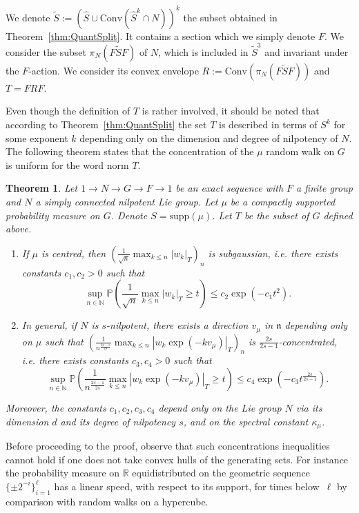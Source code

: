 \documentclass[11pt,leqno]{article}
\theoremstyle{plain}
\newtheorem{theorem}{Theorem}[section]
\theoremstyle{definition}
\theoremstyle{remark}
\numberwithin{equation}{section}
\begin{document}
We denote $\widetilde{S}:=(\widehat{S}\cup\mathrm{Conv}(\widehat{S}^k\cap N))^k$ the subset obtained in Theorem~\ref{thm:QuantSplit}. It contains a section which we simply denote $F$. %
We consider the subset $\pi_N(F\widetilde{S}F)$ of $N$, which is included in $\widetilde{S}^3$ and invariant under the $F$-action. We consider its convex envelope $R:=\mathrm{Conv}(\pi_N(F\widetilde{S}F))$ and  $T=FRF$. 

Even though the definition of $T$ is rather involved, it should be noted that according to Theorem~\ref{thm:QuantSplit} the set $T$ is described in terms of $S^k$ for some exponent $k$ depending only on the dimension and degree of nilpotency of $N$. The following theorem states that the concentration of the $\mu$ random walk on $G$ is uniform for the word norm $T$.

\begin{theorem}\label{thm:uniformconcentration}
Let $1\to N\to G\to F\to 1$ be an exact sequence with $F$ a finite group and $N$ a simply connected nilpotent Lie group. Let $\mu$ be a compactly supported probability measure on $G$. Denote $S=\mathrm{supp}(\mu)$. Let $T$ be the subset of $G$ defined above.
\begin{enumerate}
\item If ${\mu}$ is centred, then $\left(\frac{1}{\sqrt{n}}\max_{k\le n} |w_k|_T \right)_n$ is subgaussian, i.e. there exists constants $c_1,c_2>0$ such that
\[
\sup_{n\in \mathbb{N}}\mathbb{P}\left(\frac{1}{\sqrt{n}} \max_{k\le n} |w_k|_T \ge t \right) \le c_2\exp\left(-c_1t^2\right).
\]
\item In general, if $N$ is $s$-nilpotent, there exists a direction $v_\mu$ in $\mathfrak{n}$ depending only on ${\mu}$ such that 
$\left( \frac{1}{n^{\frac{2s-1}{2s}}} \max_{k\le n}|w_k\exp(-kv_\mu)|_T \right)_n$ is $\frac{2s}{2s-1}$-concentrated, i.e. there exists constants $c_3,c_4>0$ such that
\[
\sup_{n\in \mathbb{N}}\mathbb{P}\left(\frac{1}{n^{\frac{2s-1}{2s}}} \max_{k\le n} |w_k\exp(-kv_\mu)|_T \ge t \right) \le c_4\exp\left(-c_3t^{\frac{2s}{2s-1}}\right).
\]
\end{enumerate}
Moreover, the constants $c_1,c_2,c_3,c_4$ depend only on the Lie group $N$ via its dimension $d$ and its degree of nilpotency $s$, and on the spectral constant $\kappa_\mu$.
\end{theorem}

Before proceeding to the proof, observe that such concentrations inequalities cannot hold if one does not take convex hulls of the generating sets. For instance the probability measure on $\mathbb{R}$ equidistributed on the geometric sequence $\{\pm 2^{-i}\}_{i=1}^\ell$ has a linear speed, with respect to its support, for times below~$\ell$ by comparison with random walks on a hypercube.
\end{document}
